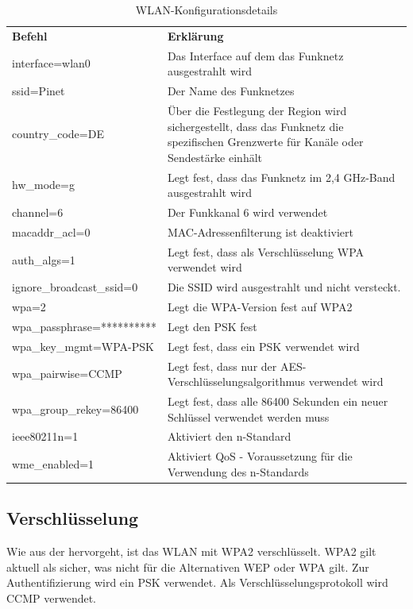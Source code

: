  
\begin{table}
\caption{WLAN-Konfigurationsdetails}
\label{tab:WLAN-Konfiguration}
\begin{tabular}{p{} p{}}
\textbf{Befehl} 						& \textbf{Erklärung} \\
interface=wlan0 						& Das Interface auf dem das Funknetz ausgestrahlt wird \\
ssid=Pinet 									& Der Name des Funknetzes \\
country\_code=DE 						& Über die Festlegung der Region wird sichergestellt, dass das Funknetz die spezifischen Grenzwerte für Kanäle oder Sendestärke einhält \\
hw\_mode=g 									& Legt fest, dass das Funknetz im 2,4 GHz-Band ausgestrahlt wird \\
channel=6 									& Der Funkkanal 6 wird verwendet \\
macaddr\_acl=0 							& MAC-Adressenfilterung ist deaktiviert \\
auth\_algs=1 								& Legt fest, dass als Verschlüsselung \ac{WPA} verwendet wird \\
ignore\_broadcast\_ssid=0 	& Die \ac{SSID} wird ausgestrahlt und nicht versteckt. \\
wpa=2 											& Legt die WPA-Version fest auf \ac{WPA2} \\
wpa\_passphrase=********** 	& Legt den \ac{PSK} fest \\
wpa\_key\_mgmt=WPA-PSK 			& Legt fest, dass ein \ac{PSK} verwendet wird \\
wpa\_pairwise=CCMP 					& Legt fest, dass nur der \ac{AES}-Verschlüsselungsalgorithmus verwendet wird \\
wpa\_group\_rekey=86400 		& Legt fest, dass alle 86400 Sekunden ein neuer Schlüssel verwendet werden muss \\
ieee80211n=1 								& Aktiviert den n-Standard \\
wme\_enabled=1 							& Aktiviert \ac{QoS} - Voraussetzung für die Verwendung des n-Standards \\
 \end{tabular}
\end{table}
\subsection{Verschlüsselung}

Wie aus der  hervorgeht, ist das WLAN mit \ac{WPA2} verschlüsselt. \ac{WPA2} gilt aktuell als sicher, was nicht für die Alternativen \ac{WEP} oder \ac{WPA} gilt. Zur Authentifizierung wird ein \ac{PSK} verwendet. Als Verschlüsselungsprotokoll wird \ac{CCMP} verwendet. 

